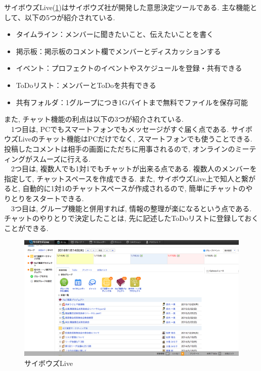 \documentclass{funthesis}
\begin{document}
サイボウズLive(\ref{cybozu})はサイボウズ社が開発した意思決定ツールである. 
主な機能として、以下の5つが紹介されている.
\begin{itemize}
 \item タイムライン：メンバーに聞きたいこと、伝えたいことを書く
 \item 掲示板：掲示板のコメント欄でメンバーとディスカッションする
 \item イベント：プロフェクトのイベントやスケジュールを登録・共有できる
 \item ToDoリスト：メンバーとToDoを共有できる
 \item 共有フォルダ：1グループにつき1Gバイトまで無料でファイルを保存可能
\end{itemize}
また, チャット機能の利点は以下の3つが紹介されている.\\
　1つ目は, PCでもスマートフォンでもメッセージがすぐ届く点である. サイボウズLiveのチャット機能はPCだけでなく, スマートフォンでも使うことできる. 投稿したコメントは相手の画面にただちに用事されるので, オンラインのミーティングがスムーズに行える. \\
　2つ目は,  複数人でも1対1でもチャットが出来る点である. 複数人のメンバーを指定して, チャットスペースを作成できる. また, サイボウズLive上で知人と繋がると, 自動的に1対1のチャットスペースが作成されるので, 簡単にチャットのやりとりをスタートできる. \\
　3つ目は,  グループ機能と併用すれば, 情報の整理が楽になるという点である. チャットのやりとりで決定したことは, 先に記述したToDoリストに登録しておくことができる. \\
\begin{figure}[H]
 \begin{center}
  \includegraphics[width=120mm]{./img/cybozulive.png}
 \end{center}
 \caption{サイボウズLive}
 \label{cybozu}
\end{figure}
\end{document}

